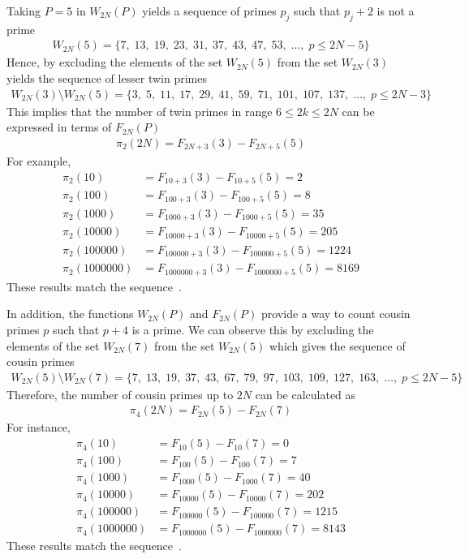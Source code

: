 Taking $P=5$ in $W_{2N}(P)$ yields a sequence of primes $p_j$ such that $p_j+2$ is not a prime~\cite{oeis:A049591}
\begin{align*}
    W_{2N}(5) = \{ 7, \; 13, \; 19, \; 23, \; 31, \; 37, \; 43, \; 47, \; 53, \; \dots, \;  p \leq 2N - 5 \}
\end{align*}
Hence, by excluding the elements of the set $W_{2N}(5)$ from the set $W_{2N}(3)$ yields the sequence of
lesser twin primes~\cite{oeis:A001359}
\begin{align*}
    W_{2N}(3) \setminus W_{2N}(5) = \{ 3, \; 5, \; 11, \; 17, \; 29, \; 41, \; 59, \; 71, \; 101, \; 107, \; 137, \; \dots, \;  p \leq 2N - 3 \}
\end{align*}
This implies that the number of twin primes in range $6 \leq 2k \leq 2N$ can be expressed in terms of $F_{2N}(P)$
\begin{align*}
    \pi_2 (2N) = F_{2N+3}(3) - F_{2N+5}(5)
\end{align*}
For example,
\begin{align*}
    \pi_2 (10) &= F_{10+3}(3) - F_{10+5}(5) = 2 \\
    \pi_2 (100) &= F_{100+3}(3) - F_{100+5}(5) = 8 \\
    \pi_2 (1000) &= F_{1000+3}(3) - F_{1000+5}(5) = 35 \\
    \pi_2 (10000) &= F_{10000+3}(3) - F_{10000+5}(5) = 205 \\
    \pi_2 (100000) &= F_{100000+3}(3) - F_{100000+5}(5) = 1224 \\
    \pi_2 (1000000) &= F_{1000000+3}(3) - F_{1000000+5}(5) = 8169
\end{align*}
These results match the sequence~\cite{oeis_A007508}.

In addition, the functions $W_{2N}(P)$ and $F_{2N}(P)$ provide a way to count cousin
primes $p$ such that $p+4$ is a prime.
We can observe this by excluding the elements of the set $W_{2N}(7)$ from the set $W_{2N}(5)$ which gives
the sequence of cousin primes~\cite{oeis:A023200}
\begin{align*}
    W_{2N}(5) \setminus W_{2N}(7) = \{ 7, \; 13, \; 19, \; 37, \; 43, \; 67, \; 79, \; 97, \; 103, \; 109, \; 127, \; 163, \; \dots, \;  p \leq 2N - 5 \}
\end{align*}
Therefore, the number of cousin primes up to $2N$ can be calculated as
\begin{align*}
    \pi_4 (2N) = F_{2N}(5) - F_{2N}(7)
\end{align*}
For instance,
\begin{align*}
    \pi_4 (10) &= F_{10}(5) - F_{10}(7) = 0 \\
    \pi_4 (100) &= F_{100}(5) - F_{100}(7) = 7 \\
    \pi_4 (1000) &= F_{1000}(5) - F_{1000}(7) = 40 \\
    \pi_4 (10000) &= F_{10000}(5) - F_{10000}(7) = 202 \\
    \pi_4 (100000) &= F_{100000}(5) - F_{100000}(7) = 1215 \\
    \pi_4 (1000000) &= F_{1000000}(5) - F_{1000000}(7) = 8143
\end{align*}
These results match the sequence~\cite{oeis:A093737}.

